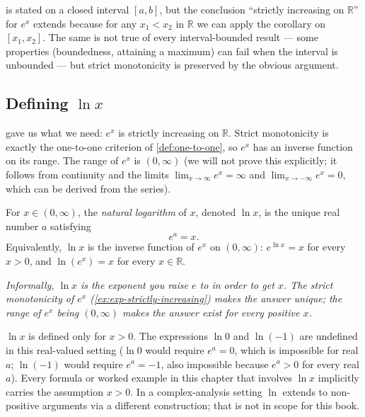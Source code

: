 \begin{caution}
 is stated on a closed interval \([a, b]\), but the conclusion ``strictly increasing on \(\mathbb{R}\)'' for \(e^{x}\) extends because for any \(x_{1} < x_{2}\) in \(\mathbb{R}\) we can apply the corollary on \([x_{1}, x_{2}]\). The same is not true of every interval-bounded result --- some properties (boundedness, attaining a maximum) can fail when the interval is unbounded --- but strict monotonicity is preserved by the obvious argument.
\end{caution}

\subsection{Defining \texorpdfstring{$\ln x$}{ln x}}

 gave us what we need: \(e^{x}\) is strictly increasing on \(\mathbb{R}\). Strict monotonicity is exactly the one-to-one criterion of \cref{def:one-to-one}, so \(e^{x}\) has an inverse function on its range. The range of \(e^{x}\) is \((0, \infty)\) (we will not prove this explicitly; it follows from continuity and the limits \(\lim_{x \to \infty} e^{x} = \infty\) and \(\lim_{x \to -\infty} e^{x} = 0\), which can be derived from the series).

\begin{definition}\label{def:logarithm}
For \(x \in (0, \infty)\), the \emph{natural logarithm} of \(x\), denoted \(\ln x\), is the unique real number \(a\) satisfying
\[
e^{a} = x.
\]
Equivalently, \(\ln x\) is the inverse function of \(e^{x}\) on \((0, \infty)\): \(e^{\ln x} = x\) for every \(x > 0\), and \(\ln(e^{x}) = x\) for every \(x \in \mathbb{R}\).

\emph{Informally, \(\ln x\) is the exponent you raise \(e\) to in order to get \(x\). The strict monotonicity of \(e^{x}\) (\cref{ex:exp-strictly-increasing}) makes the answer unique; the range of \(e^{x}\) being \((0, \infty)\) makes the answer exist for every positive \(x\).}
\end{definition}

\begin{caution}
\(\ln x\) is defined only for \(x > 0\). The expressions \(\ln 0\) and \(\ln(-1)\) are undefined in this real-valued setting (\(\ln 0\) would require \(e^{a} = 0\), which is impossible for real \(a\); \(\ln(-1)\) would require \(e^{a} = -1\), also impossible because \(e^{a} > 0\) for every real \(a\)). Every formula or worked example in this chapter that involves \(\ln x\) implicitly carries the assumption \(x > 0\). In a complex-analysis setting \(\ln\) extends to non-positive arguments via a different construction; that is not in scope for this book.
\end{caution}

